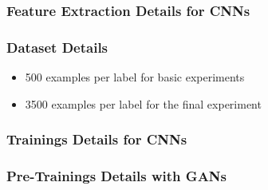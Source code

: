 \begin{frame}
  \frametitle{Feature Extraction Details for CNNs}
  \centering \vfill
  
\end{frame}

\begin{frame}
  \frametitle{Dataset Details}
  \begin{itemize}
    \item 500 examples per label for basic experiments
    \item 3500 examples per label for the final experiment
  \end{itemize}
  
\end{frame}

\begin{frame}
  \frametitle{Trainings Details for CNNs}
  \centering \vfill
  
\end{frame}

\begin{frame}
  \frametitle{Pre-Trainings Details with GANs}
  \centering \vfill
  
\end{frame}

